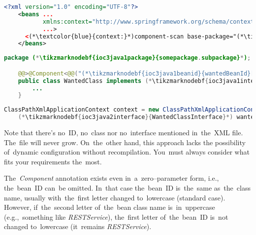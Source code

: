 \begin{lstlisting}[language=XML, title={Configuration XML}]
    <?xml version="1.0" encoding="UTF-8"?>
    <beans ...
           xmlns:context="http://www.springframework.org/schema/context"
           ...>
      <(*\textcolor{blue}{context:}*)component-scan base-package="(*\tikzmarknodebf{ioc3xml1package}{somepackage.subpackage}[ForestGreen]*)"/>
    </beans>
\end{lstlisting}
\begin{lstlisting}[language=Java, title={Wanted class}]
    package (*\tikzmarknodebf{ioc3java1package}{somepackage.subpackage}*);

    @@>@Component<@@("(*\tikzmarknodebf{ioc3java1beanid}{wantedBeanId}[ForestGreen]*)")
    public class WantedClass implements (*\tikzmarknodebf{ioc3java1interface}{WantedClassInterface}*) {
        ...
    }
\end{lstlisting}
\begin{lstlisting}[language=Java, title={Usage}]
    ClassPathXmlApplicationContext context = new ClassPathXmlApplicationContext("configurationFile.xml");
    (*\tikzmarknodebf{ioc3java2interface}{WantedClassInterface}*) wantedClassInstance = context.getBean("(*\tikzmarknodebf{ioc3java2beanid}{wantedBeanId}[ForestGreen]*)", (*\tikzmarknodebf{ioc3java2interface2}{WantedClassInterface}*).class);
\end{lstlisting}

\noindent Note that there's no~ID, no~class nor no~interface mentioned in~the~XML file. The~file will never grow. On~the~other hand, this approach  lacks the possibility of~dynamic configuration without recompilation. You~must always consider what fits your requirements the~most.

The~\textit{Component} annotation exists even in~a~zero--parameter form, i.e., the~bean~ID can~be omitted. In~that case the~bean~ID is~the~same as~the~class name, usually with~the~first letter changed to~lowercase (standard case). However, if~the~second letter of~the~bean class name is~in~uppercase (e.g.,~something like \textit{\mbox{RESTService}}), the~first letter of~the~bean~ID is~not changed to~lowercase (it~remains \textit{\mbox{RESTService}}).
\newpage

